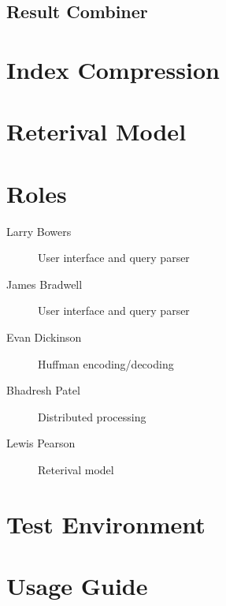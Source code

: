 \documentclass[letterpaper,11pt,twoside]{article}
\begin{document}
\subsection{Result Combiner}

\section{Index Compression}


\section{Reterival Model}


\section{Roles}
\begin{description}
  \item[Larry Bowers] User interface and query parser
  \item[James Bradwell] User interface and query parser
  \item[Evan Dickinson] Huffman encoding/decoding 
  \item[Bhadresh Patel] Distributed processing
  \item[Lewis Pearson] Reterival model
\end{description}

\section{Test Environment}


\section{Usage Guide}
\end{document}
